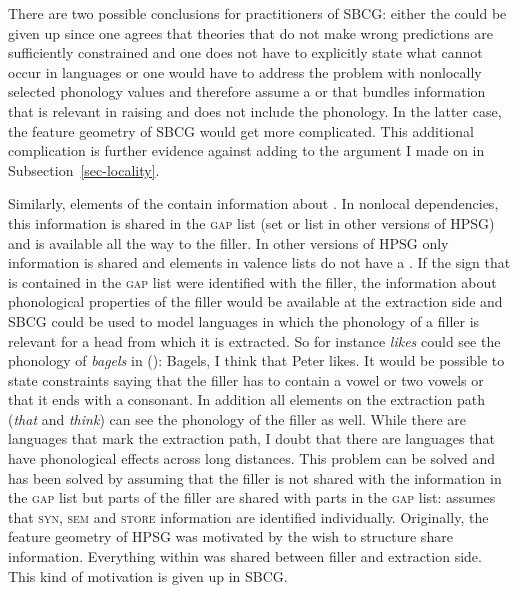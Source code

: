 \documentclass[output=paper]{langsci/langscibook}
\begin{document}
There are two possible conclusions for practitioners of SBCG: either the \motherf could be given up
since one agrees that theories that do not make wrong predictions are sufficiently constrained and
one does not have to explicitly state what cannot occur in languages or one would have to address
the problem with nonlocally selected phonology values and therefore assume a \synsem or \localf that
bundles information that is relevant in raising and does not include the
phonology.
In the latter case, the feature geometry of SBCG would get more complicated. This additional
complication is further evidence against \mother adding to the argument I made on \mother in Subsection~\ref{sec-locality}.

\label{sec-local-feature-sbcg}

Similarly, elements of the \argstl contain information about \form. In nonlocal dependencies, this
information is shared in the \textsc{gap} list (\slasch set or list in other versions of
HPSG) and is available all the way to the filler. In other versions of HPSG only \local information is shared and elements in valence lists
do not have a \phonf. If the sign that is contained in the \textsc{gap} list were identified with
the filler, the information about phonological properties of the filler would be available at the
extraction side and SBCG could be used to model languages in which the phonology of
a filler is relevant for a head from which it is extracted. So for instance \emph{likes} could see the
phonology of \emph{bagels} in ():
\ea
Bagels, I think that Peter likes.
\z
It would be possible to state constraints saying that the filler has to contain a vowel or two
vowels or that it ends with a consonant. In addition all elements on the extraction path
(\emph{that} and \emph{think}) can see the phonology of the filler as well. While there are
languages that mark the extraction path, I doubt that there are languages that have phonological
effects across long distances. This problem can be solved and has been solved by assuming that the
filler is not shared with the information in the \textsc{gap} list but parts of the filler are
shared with parts in the \textsc{gap} list: \citet[]{Sag2012a} assumes that \textsc{syn},
\textsc{sem} and \textsc{store} information are identified individually. Originally, the feature
geometry of HPSG was motivated by the wish to structure share information. Everything within \local
was shared between filler and extraction side. This kind of motivation is given up in SBCG.
\end{document}
